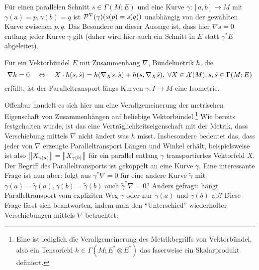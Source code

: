 \documentclass[../H_Analysis_main.tex]{subfiles}
\begin{document}
\begin{bsp}
Für einen parallelen Schnitt $s \in \Gamma(M; E)$ und eine Kurve $\gamma: [a, b] \rightarrow M$ mit $\gamma(a) = p, \gamma(b) = q$ ist $\mathcal{P}^\nabla(\gamma)\qty(s(p) = s(q))$ unabhängig von der gewählten Kurve zwischen $p, q$. Das Besondere an dieser Aussage ist, dass hier $\nabla s = 0$ entlang jeder Kurve $\gamma$ gilt (daher wird hier auch ein Schnitt in $E$ statt $\gamma^* E$ abgeleitet).
\end{bsp}



\begin{lemma}
Für ein Vektorbündel $E$ mit Zusammenhang $\nabla$, Bündelmetrik $h$, die
\begin{equation}
\nabla h = 0 \quad \Leftrightarrow \quad X \cdot h(s, \tilde{s}) = h\qty(\nabla_X s, \tilde{s}) + h\qty(s, \nabla_X \tilde{s}), \; \forall X \in \mathcal{X}(M), s, \tilde{s} \in \Gamma(M; E)
\end{equation}
erfüllt, ist der Paralleltransport längs Kurven $\gamma: I \rightarrow M$ eine Isometrie.
\end{lemma}

Offenbar handelt es sich hier um eine Verallgemeinerung der metrischen Eigenschaft von Zusammenhängen auf beliebige Vektorbündel.\footnote{Eine  ist lediglich die Verallgemeinerung des Metrikbegriffs von Vektorbündel, also ein Tensorfeld $h \in \Gamma(M; E^* \otimes E^*)$ das faserweise ein Skalarprodukt definiert.} Wie bereits festgehalten wurde, ist das eine Verträglichkeitseigenschaft mit der Metrik, dass Verschiebung mittels $\nabla$ nicht ändert was $h$ misst. Insbesondere bedeutet das, dass jeder von $\nabla$ erzeugte Paralleltransport Längen und Winkel erhält, beispielsweise ist also $\norm{X_{\gamma(a)}} = \norm{X_{\gamma(b)}}$ für ein parallel entlang $\gamma$ transportiertes Vektorfeld $X$.\\%



Der Begriff des Paralleltransports ist gekoppelt an eine Kurve $\gamma$. Eine interessante Frage ist nun aber: folgt aus $\gamma^* \nabla = 0$ für eine andere Kurve $\tilde{\gamma}$ mit $\gamma(a) = \tilde{\gamma}(a), \gamma(b) = \tilde{\gamma}(b)$ auch $\tilde{\gamma}^* \nabla = 0$? Anders gefragt: hängt Paralleltransport vom expliziten Weg $\gamma$ oder nur $\gamma(a)$ und $\gamma(b)$ ab? Diese Frage lässt sich beantworten, indem man den \enquote{Unterschied} wiederholter Verschiebungen mittels $\nabla$ betrachtet:
\end{document}
